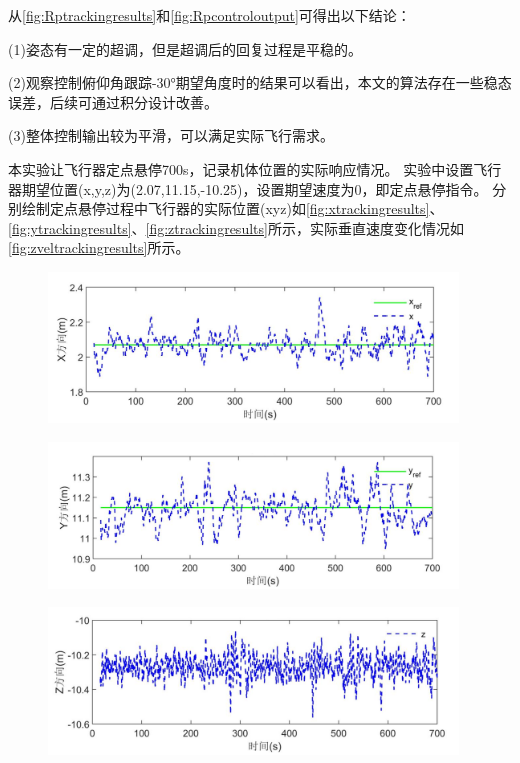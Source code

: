 \documentclass[
  type=master
]{gdutthesis}
\begin{document}
从\autoref{fig:Rptrackingresults}和\autoref{fig:Rpcontroloutput}可得出以下结论：

(1)姿态有一定的超调，但是超调后的回复过程是平稳的。

(2)观察控制俯仰角跟踪-30°期望角度时的结果可以看出，本文的算法存在一些稳态误差，后续可通过积分设计改善。

(3)整体控制输出较为平滑，可以满足实际飞行需求。

本实验让飞行器定点悬停700s，记录机体位置的实际响应情况。
实验中设置飞行器期望位置(x,y,z)为(2.07,11.15,-10.25)，设置期望速度为0，即定点悬停指令。
分别绘制定点悬停过程中飞行器的实际位置(xyz)如\autoref{fig:xtrackingresults}、\autoref{fig:ytrackingresults}、\autoref{fig:ztrackingresults}所示，实际垂直速度变化情况如\autoref{fig:zveltrackingresults}所示。
\begin{figure}[H]
	\centering
	\includegraphics[width=0.97\textwidth]{屏幕截图 2022-04-10 192550.png}
	\label{fig:xtrackingresults}
\end{figure}

\begin{figure}[H]
	\centering
	\includegraphics[width=0.97\textwidth]{屏幕截图 2022-04-10 193508.png}
	\label{fig:ytrackingresults}
\end{figure}

\begin{figure}[H]
	\centering
	\includegraphics[width=0.97\textwidth]{屏幕截图 2022-04-10 193919.png}
	\label{fig:ztrackingresults}
\end{figure}
\end{document}
